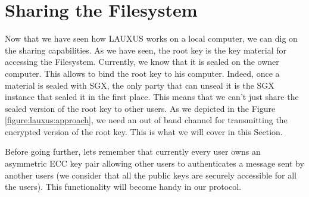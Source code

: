 \documentclass[../main.tex]{subfiles}
\begin{document}
\section{Sharing the Filesystem}
\label{section:lauxus:sharing}

\par Now that we have seen how LAUXUS works on a local computer, we can dig on the sharing capabilities. As we have seen, the root key is the key material for accessing the Filesystem. Currently, we know that it is sealed on the owner computer. This allows to bind the root key to his computer. Indeed, once a material is sealed with SGX, the only party that can unseal it is the SGX instance that sealed it in the first place. This means that we can't just share the sealed version of the root key to other users. As we depicted in the Figure \ref{figure:lauxus:approach}, we need an out of band channel for transmitting the encrypted version of the root key. This is what we will cover in this Section.

\par Before going further, lets remember that currently every user owns an asymmetric ECC key pair allowing other users to authenticates a message sent by another users (we consider that all the public keys are securely accessible for all the users). This functionality will become handy in our protocol.
\end{document}
